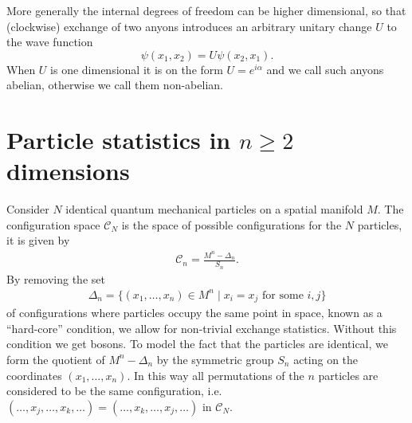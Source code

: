\documentclass[a4paper,10pt,oneside]{book}
\theoremstyle{plain}
\theoremstyle{definition}
\theoremstyle{remark}
\begin{document}
More generally the internal degrees of freedom can be higher dimensional, so that (clockwise) exchange of two anyons introduces an arbitrary unitary change $U$ to the wave function
\begin{equation}
  \psi(x_1, x_2) = U \psi(x_2, x_1).
\end{equation}
When $U$ is one dimensional it is on the form $U = e^{i\alpha}$ and we call such anyons abelian, otherwise we call them non-abelian.



\section{Particle statistics in \texorpdfstring{$n \ge 2$}{n ≥ 2} dimensions}

Consider $N$ identical quantum mechanical particles on a spatial manifold $M$.
The configuration space $\mathcal{C}_N$ is the space of possible configurations for the $N$ particles, it is given by
\begin{align}
  \mathcal{C}_n = \frac{M^n - \Delta_n}{S_n}.
\end{align}
By removing the set
\begin{align}
  \Delta_n = \{(x_1,\ldots,x_n) \in M^n \mid x_i = x_j \text{ for some } i, j\}
\end{align}
of configurations where particles occupy the same point in space, known as a ``hard-core'' condition, we allow for non-trivial exchange statistics. Without this condition we get bosons. To model the fact that the particles are identical, we form the quotient of $M^n - \Delta_n$ by the symmetric group $S_n$ acting on the coordinates $(x_1,…,x_n)$. In this way all permutations of the $n$ particles are considered to be the same configuration, i.e.\ $(…,x_j,…,x_k,…) = (…,x_k,…,x_j,…)$ in $\mathcal{C}_N$.

\end{document}
